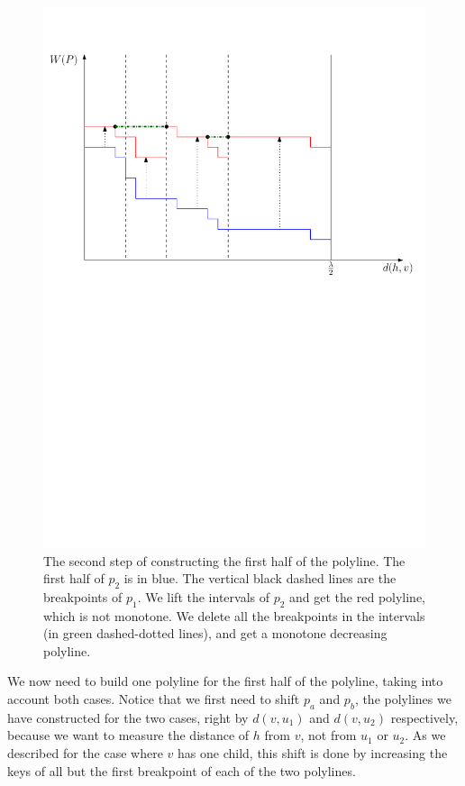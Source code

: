 \documentclass[11pt,a4paper]{article}
\theoremstyle{definition}
\theoremstyle{remark}
\begin{document}
\begin{enumerate}
\begin{figure}[h]
\begin{center}
\includegraphics[scale=0.5]{polyline_first_half_construction_case2}
\end{center}
\caption{The second step of constructing the first half of the polyline. The first half of $p_2$ is in blue. The vertical black dashed lines are the breakpoints of $p_1$. We lift the intervals of $p_2$ and get the red polyline, which is not monotone. We delete all the breakpoints in the intervals (in green dashed-dotted lines), and get a monotone decreasing polyline.
}
\end{figure}

\end{enumerate}

We now need to build one polyline for the first half of the polyline, taking into account both cases. Notice that we first need to shift $p_a$ and $p_b$, the polylines we have constructed for the two cases, right by $d(v,u_1)$ and $d(v,u_2)$ respectively, because we want to measure the distance of $h$ from $v$, not from $u_1$ or $u_2$. As we described for the case where $v$ has one child, this shift is done by increasing the keys of all but the first breakpoint of each of the two polylines.
\end{document}
